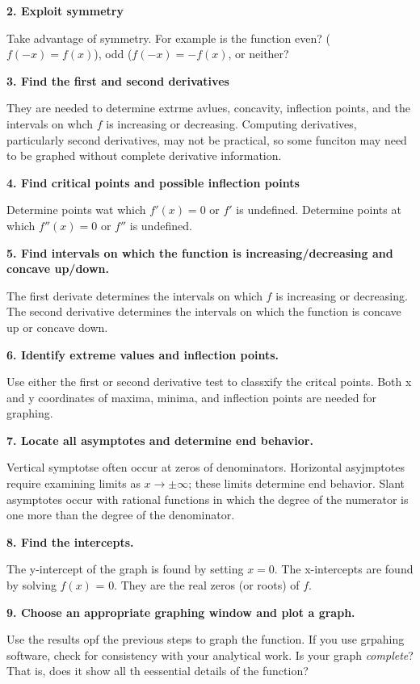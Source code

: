 {\par \bf 2. Exploit symmetry} 
Take advantage of symmetry. For example is the function even?
($f(-x) = f(x)$), odd ($f(-x) = -f(x)$, or neither?

{\par \bf 3. Find the first and second derivatives} 
They are needed to determine extrme avlues,
concavity, inflection points, and the intervals on whch $f$ is
increasing or decreasing. Computing derivatives, particularly
second derivatives, may not be practical, so some funciton may need
to be graphed without complete derivative information.

{\par \bf 4. Find critical points and possible inflection points}
Determine points wat which $f'(x) = 0$ or $f'$ is undefined.
Determine points at which $f''(x) = 0$ or $f''$ is undefined.

{\par \bf 5. Find intervals on which the function is increasing/decreasing
and concave up/down.}
The first derivate determines the intervals on which $f$ is
increasing or decreasing. The second derivative
determines the intervals on which the
function is concave up or concave down.

{\par \bf 6. Identify extreme values and inflection points.} 
Use either the first or second derivative test to classxify
the critcal points. Both x and y coordinates of maxima,
minima, and inflection points are needed for graphing.

{\par \bf 7. Locate all asymptotes and determine end behavior.} 
Vertical symptotse often occur at zeros of denominators.
Horizontal asyjmptotes require examining limits as $x \to \pm \infty$;
these limits determine end behavior. Slant asymptotes occur
with rational functions in which the degree of the numerator
is one more than the degree of the denominator.

{\par \bf 8. Find the intercepts.} 
The y-intercept of the graph is found by setting $x = 0$.
The x-intercepts are found by solving $f(x)$ = 0. They are the real zeros
(or roots) of $f$.

{\par \bf 9. Choose an appropriate graphing window and plot a graph.} 
Use the results opf the previous steps to graph the function.
If you use grpahing software, check for consistency with your
analytical work. Is your graph {\it complete}? That is,
does it show all th eessential details of the function?
\enddef

